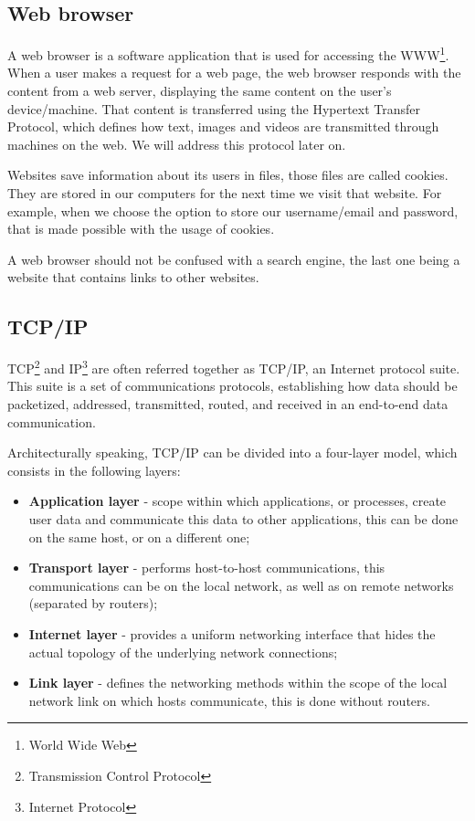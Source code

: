 \documentclass{article}
\newcommand\tab[1][1cm]{\hspace*{#1}}
\begin{document}
\subsection{Web browser}

\tab A web browser is a software application that is used for accessing the WWW\footnote{World Wide Web}. When a user makes a request for a web page, the web browser responds with the content from a web server, displaying the same content on the user's device/machine. That content is transferred using the Hypertext Transfer Protocol, which defines how text, images and videos are transmitted through machines on the web. We will address this protocol later on.

Websites save information about its users in files, those files are called cookies. They are stored in our computers for the next time we visit that website. For example, when we choose the option to store our username/email and password, that is made possible with the usage of cookies.

A web browser should not be confused with a search engine, the last one being a website that contains links to other websites.

\subsection{TCP/IP}

\tab TCP\footnote{Transmission Control Protocol} and IP\footnote{Internet Protocol} are often referred together as TCP/IP, an Internet protocol suite. This suite is a set of communications protocols, establishing how data should be packetized, addressed, transmitted, routed, and received in an end-to-end data communication.

Architecturally speaking, TCP/IP can be divided into a four-layer model, which consists in the following layers:

\begin{itemize}
    \item \textbf{Application layer} - scope within which applications, or processes, create user data and communicate this data to other applications, this can be done on the same host, or on a different one;
    \item \textbf{Transport layer} - performs host-to-host communications, this communications can be on the local network, as well as on remote networks (separated by routers);
    \item \textbf{Internet layer} - provides a uniform networking interface that hides the actual topology of the underlying network connections;
    \item \textbf{Link layer} - defines the networking methods within the scope of the local network link on which hosts communicate, this is done without routers.
\end{itemize}
\end{document}
